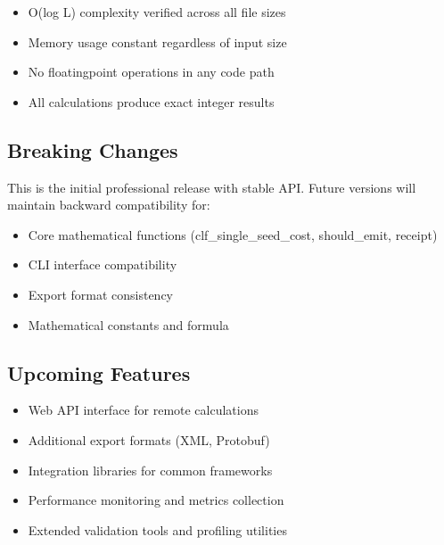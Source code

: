 \documentclass[letterpaper,10pt,english]{sphinxmanual}
\begin{document}
\sphinxAtStartPar
{}
\begin{itemize}
\item {} 
\sphinxAtStartPar
O(log L) complexity verified across all file sizes

\item {} 
\sphinxAtStartPar
Memory usage constant regardless of input size

\item {} 
\sphinxAtStartPar
No floating\sphinxhyphen{}point operations in any code path

\item {} 
\sphinxAtStartPar
All calculations produce exact integer results

\end{itemize}


\subsection{Breaking Changes}
\label{\detokenize{changelog:breaking-changes}}
\sphinxAtStartPar
{}

\sphinxAtStartPar
This is the initial professional release with stable API. Future versions will maintain backward compatibility for:
\begin{itemize}
\item {} 
\sphinxAtStartPar
Core mathematical functions (clf\_single\_seed\_cost, should\_emit, receipt)

\item {} 
\sphinxAtStartPar
CLI interface compatibility

\item {} 
\sphinxAtStartPar
Export format consistency

\item {} 
\sphinxAtStartPar
Mathematical constants and formula

\end{itemize}


\subsection{Upcoming Features}
\label{\detokenize{changelog:upcoming-features}}
\sphinxAtStartPar
{}
\begin{itemize}
\item {} 
\sphinxAtStartPar
Web API interface for remote calculations

\item {} 
\sphinxAtStartPar
Additional export formats (XML, Protobuf)

\item {} 
\sphinxAtStartPar
Integration libraries for common frameworks

\item {} 
\sphinxAtStartPar
Performance monitoring and metrics collection

\item {} 
\sphinxAtStartPar
Extended validation tools and profiling utilities

\end{itemize}
\end{document}
